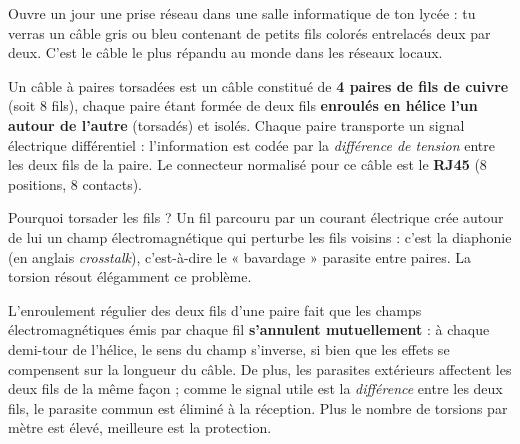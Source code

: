 \documentclass[11pt]{article}
\newcommand{\cle}[1]{{\popxbold\color{popdark}#1}}
\newcounter{popsec}
\newcounter{popsub}
\newcommand{\courssub}[1]{%
  \stepcounter{popsub}%
  \par\vspace{9pt}\noindent{\popxbold\fontsize{11.5}{13}\selectfont\color{popink}{\color{poporange}\thepopsec.\thepopsub}\hspace{6pt}#1}\par\nopagebreak\vspace{4pt}
}
\begin{document}
\courssub{Constitution et principe}

Ouvre un jour une prise réseau dans une salle informatique de ton lycée : tu verras un câble gris ou bleu contenant de petits fils colorés entrelacés deux par deux. C'est le câble le plus répandu au monde dans les réseaux locaux.

\begin{definition}
Un \cle{câble à paires torsadées} est un câble constitué de \textbf{4 paires de fils de cuivre} (soit 8 fils), chaque paire étant formée de deux fils \textbf{enroulés en hélice l'un autour de l'autre} (torsadés) et isolés. Chaque paire transporte un signal électrique différentiel : l'information est codée par la \emph{différence de tension} entre les deux fils de la paire. Le connecteur normalisé pour ce câble est le \textbf{RJ45} (8 positions, 8 contacts).
\end{definition}

Pourquoi torsader les fils ? Un fil parcouru par un courant électrique crée autour de lui un champ électromagnétique qui perturbe les fils voisins : c'est la \cle{diaphonie} (en anglais \emph{crosstalk}), c'est-à-dire le « bavardage » parasite entre paires. La torsion résout élégamment ce problème.

\begin{propriete}
L'enroulement régulier des deux fils d'une paire fait que les champs électromagnétiques émis par chaque fil \textbf{s'annulent mutuellement} : à chaque demi-tour de l'hélice, le sens du champ s'inverse, si bien que les effets se compensent sur la longueur du câble. De plus, les parasites extérieurs affectent les deux fils de la même façon ; comme le signal utile est la \emph{différence} entre les deux fils, le parasite commun est éliminé à la réception. Plus le nombre de torsions par mètre est élevé, meilleure est la protection.
\end{propriete}
\end{document}

